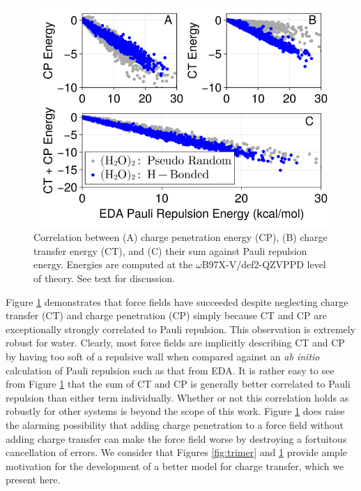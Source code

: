 \documentclass[journal=jctcce,manuscript=article]{achemso}
\begin{document}
\begin{figure}[H]
  \includegraphics*[width=\textwidth]{figures/pauli_ct_cp_correlation.png}
  \caption{Correlation between (A) charge penetration energy (CP), (B) charge transfer energy (CT),
  and (C) their sum against Pauli repulsion energy.
  Energies are computed at the $\omega$B97X-V/def2-QZVPPD level of theory. See text for discussion.}
  \label{fig:cp_ct_pauli}
\end{figure}

Figure \ref{fig:cp_ct_pauli} demonstrates that force fields have succeeded despite neglecting charge transfer (CT) and charge penetration (CP) simply because CT and CP are exceptionally strongly correlated to Pauli repulsion. This observation is extremely robust for water. Clearly, most force fields are implicitly describing CT and CP by having too soft of a repulsive wall when compared against an \textit{ab initio} calculation of Pauli repulsion such as that from EDA. It is rather easy to see from Figure \ref{fig:cp_ct_pauli} that the sum of CT and CP is generally better correlated to Pauli repulsion than either term individually. Whether or not this correlation holds as robustly for other systems is beyond the scope of this work. Figure \ref{fig:cp_ct_pauli} does raise the alarming possibility that adding charge penetration to a force field without adding charge transfer can make the force field worse by destroying a fortuitous cancellation of errors. We consider that Figures \ref{fig:trimer} and \ref{fig:cp_ct_pauli} provide ample motivation for the development of a better model for charge transfer, which we present here.
\end{document}
